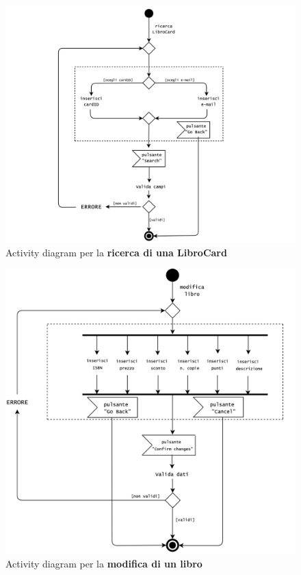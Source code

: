 \documentclass[12pt,a4paper]{article}
\begin{document}
	\newpage
	\begin{figure}[h!]
		\centering
		\includegraphics[scale=0.45]{images/ActivityDiagrams/RicercaLibroCard.png}
		\caption{Activity diagram per la \textbf{ricerca di una LibroCard}}
	\end{figure}
	\begin{figure}[h!]
		\centering
		\includegraphics[scale=0.45]{images/ActivityDiagrams/ModificaLibro.png}
		\caption{Activity diagram per la \textbf{modifica di un libro}}
	\end{figure}
\end{document}
